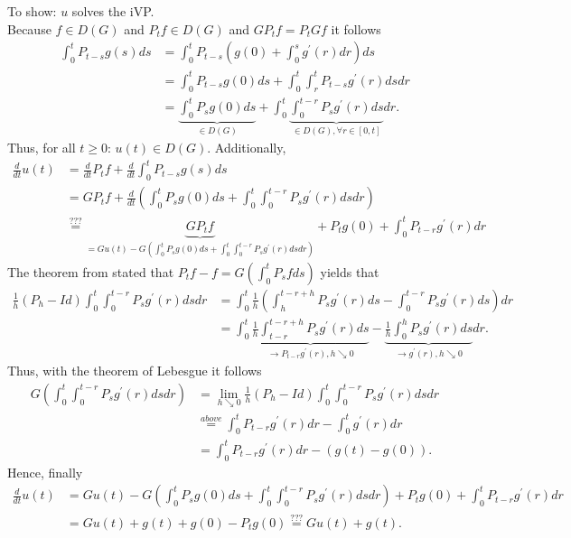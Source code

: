 \documentclass[a4paper,12pt,twoside]{article}
\begin{document}
{\begin{itemize}
            To show: $u$ solves the iVP.\\
            Because $f \in D(G)$ and $P_t f \in D(G)$ and $G P_t f = P_t G f$ it follows 
            \begin{align*}
                \int_0^t P_{t-s} g(s) ds &= \int_0^t P_{t-s} (g(0) + \int_0^s g^\prime (r) dr) ds \\
                &= \int_0^t P_{t-s} g(0) ds + \int_0^t \int_r^t P_{t-s} g^\prime (r ) ds dr \\
                &= \underbrace{ \int_0^t P_s g(0) ds}_{\in D(G)} + \int_0^t \underbrace{\int_0^{t-r} P_s g^\prime (r) ds }_{\in D(G), \forall r \in [0,t]} dr.
            \end{align*}
            Thus, for all $t \geq 0$: $u(t) \in D(G)$. Additionally, 
            \begin{align*}
                \frac{d}{dt} u(t) &= \frac{d}{dt} P_t f + \frac{d}{dt} \int_0^t P_{t-s} g(s) ds \\
                &= GP_t f + \frac{d}{dt} ( \int_0^t P_s g(0) ds + \int_0^t \int_0^{t-r} P_s g^\prime (r) ds dr ) \\
                & \stackrel{???}{=} \underbrace{G P_t f}_{= G u (t) - G ( \int_0^t P_s g(0) ds + \int_0^t \int_0^{t-r} P_s g^\prime (r) ds dr )}+ P_t g(0) + \int_0^t P_{t-r} g^\prime (r )dr 
            \end{align*}
            The theorem from stated that $P_t f -f = G( \int_0^t P_s f ds)$ yields that 
            \begin{align*}
                \frac{1}{h} (P_h - Id) \int_0^t \int_0^{t-r} P_s g^\prime (r) ds dr &= \int_0^t \frac{1}{h} ( \int_h^{t-r+h} P_s g^\prime (r) ds - \int_0^{t-r} P_s g^\prime (r) ds ) dr \\
                &= \int_0^t \underbrace{ \frac{1}{h} \int_{t-r}^{t-r+h} P_s g^\prime (r) ds}_{\to P_{t-r} g^\prime (r), h \searrow 0} - \underbrace{ \frac{1}{h} \int_0^h P_s g^\prime (r) ds }_{\to g^\prime (r), h \searrow 0} dr.
            \end{align*}
            Thus, with the theorem of Lebesgue it follows 
            \begin{align*}
                G \left( \int_0^t \int_0^{t-r} P_s g^\prime (r) ds dr \right) &= \lim_{h \searrow 0} \frac{1}{h} (P_h - Id) \int_0^t \int_0^{t-r} P_s g^\prime (r) ds dr \\
                & \stackrel{above}{=} \int_0^t P_{t-r} g^\prime (r) dr - \int_0^t g^\prime (r) dr \\
                &= \int_0^t P_{t-r} g^\prime (r) dr - (g(t) - g(0)).
            \end{align*}
            Hence, finally 
            \begin{align*}
                \frac{d}{dt} u(t) &= G u(t) - G \left( \int_0^t P_s g(0) ds + \int_0^t \int_0^{t-r} P_s g^\prime (r) ds dr \right) + P_t g(0) + \int_0^t P_{t-r} g^\prime (r) dr\\
                &= Gu (t) + g(t) + g(0) - P_t g(0) \stackrel{???}{=} Gu(t) + g(t).
            \end{align*}
    \end{itemize}
}
\end{document}
